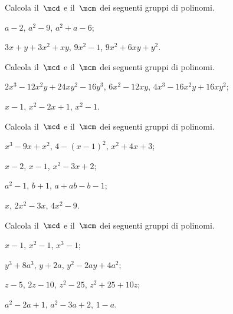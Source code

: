 \begin{esercizio}[\Ast]
\label{ese:13.92}
Calcola il~$\mcd$ e il~$\mcm$ dei seguenti gruppi di polinomi.
\begin{enumeratea}
 \item $a-2$, $a^{2}-9$, $a^{2}+a-6$;
 \item $3x+y+3x^{2}+xy$, $9x^{2}-1$, $9x^{2}+6xy+y^{2}$.
\end{enumeratea}
\end{esercizio}
\pagebreak
\begin{esercizio}[\Ast]
\label{ese:13.93}
Calcola il~$\mcd$ e il~$\mcm$ dei seguenti gruppi di polinomi.
\begin{enumeratea}
 \item $2x^{3}-12x^{2}y+24xy^{2}-16y^{3}$, $6x^{2}-12xy$, $4x^{3}-16x^{2}y+16xy^{2}$;
 \item $x-1$, $x^{2}-2x+1$, $x^{2}-1$.%
\end{enumeratea}
\end{esercizio}

\begin{esercizio}
\label{ese:13.94}
Calcola il~$\mcd$ e il~$\mcm$ dei seguenti gruppi di polinomi.
\begin{multicols}{2}
\begin{enumeratea}
 \item $x^{3}-9x+x^{2}$, $4-(x-1)^{2}$, $x^{2}+4x+3$;
 \item $x-2$, $x-1$, $x^{2}-3x+2$;
 \item $a^{2}-1$, $b+1$, $a+ab-b-1$;
 \item $x$, $2x^{2}-3x$, $4x^{2}-9$.
\end{enumeratea}
\end{multicols}
\end{esercizio}

\begin{esercizio}
\label{ese:13.95}
Calcola il~$\mcd$ e il~$\mcm$ dei seguenti gruppi di polinomi.
\begin{multicols}{2}
\begin{enumeratea}
 \item $x-1$, $x^{2}-1$, $x^{3}-1$;
 \item $y^{3}+8a^{3}$, $y+2a$, $y^{2}-2ay+4a^{2}$;
 \item $z-5$, $2z-10$, $z^{2}-25$, $z^{2}+25+10z$;
 \item $a^{2}-2a+1$, $a^{2}-3a+2$, $1-a$.
\end{enumeratea}
\end{multicols}
\end{esercizio}

